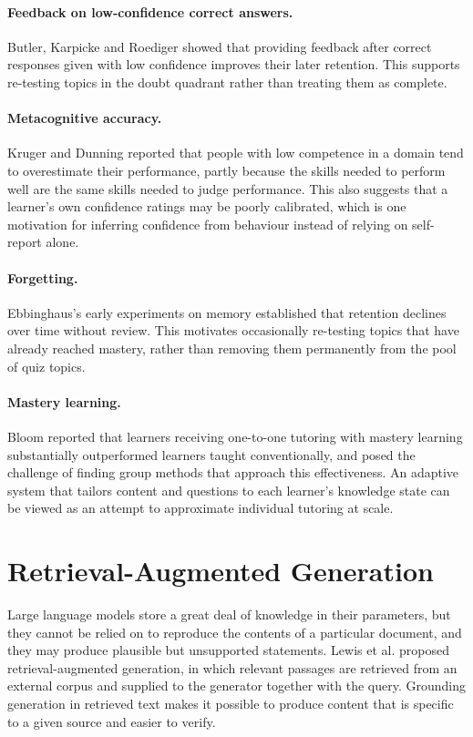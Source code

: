 \documentclass[12pt,a4paper,oneside]{report}
\begin{document}
\paragraph{Feedback on low-confidence correct answers.} Butler, Karpicke
and Roediger \cite{butler2008} showed that providing feedback after
correct responses given with low confidence improves their later
retention. This supports re-testing topics in the doubt quadrant rather
than treating them as complete.

\paragraph{Metacognitive accuracy.} Kruger and Dunning
\cite{kruger1999unskilled} reported that people with low competence in a
domain tend to overestimate their performance, partly because the skills
needed to perform well are the same skills needed to judge performance.
This also suggests that a learner's own confidence ratings may be poorly
calibrated, which is one motivation for inferring confidence from
behaviour instead of relying on self-report alone.

\paragraph{Forgetting.} Ebbinghaus's early experiments on memory
\cite{ebbinghaus1885} established that retention declines over time
without review. This motivates occasionally re-testing topics that have
already reached mastery, rather than removing them permanently from the
pool of quiz topics.

\paragraph{Mastery learning.} Bloom \cite{bloom1984} reported that learners
receiving one-to-one tutoring with mastery learning substantially
outperformed learners taught conventionally, and posed the challenge of
finding group methods that approach this effectiveness. An adaptive system
that tailors content and questions to each learner's knowledge state can be
viewed as an attempt to approximate individual tutoring at scale.

\section{Retrieval-Augmented Generation}

Large language models store a great deal of knowledge in their parameters,
but they cannot be relied on to reproduce the contents of a particular
document, and they may produce plausible but unsupported statements. Lewis
et al. \cite{lewis2020rag} proposed retrieval-augmented generation, in
which relevant passages are retrieved from an external corpus and supplied
to the generator together with the query. Grounding generation in
retrieved text makes it possible to produce content that is specific to a
given source and easier to verify.
\end{document}
